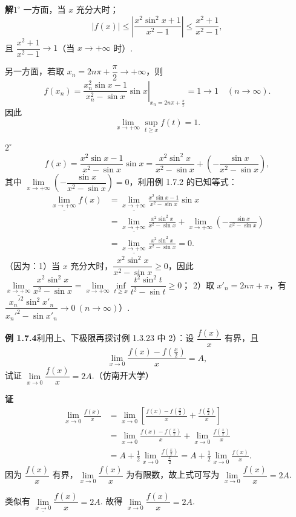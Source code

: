 \documentclass[UTF8,12pt,a4paper,fontset=fandol]{ctexart}
\begin{document}
\noindent\textbf{解}\quad $1^\circ$ 一方面，当 $x$ 充分大时；
\[
  |f(x)|\le \left|\frac{x^2\sin^2 x+1}{x^2-1}\right|\le \frac{x^2+1}{x^2-1},
\]
且 $\dfrac{x^2+1}{x^2-1}\to1$（当 $x\to+\infty$ 时）.

另一方面，若取 $x_n=2n\pi+\dfrac\pi2\to+\infty$，则
\[
  f(x_n)=\left.\frac{x_n^2\sin x-1}{x_n^2-\sin x}\sin x\right|_{x_n=2n\pi+\frac\pi2}
  =1\to1\quad(n\to\infty).
\]
因此
\[
  \lim_{x\to+\infty}\sup_{t\ge x}f(t)=1.
\]

$2^\circ$
\[
  f(x)=\frac{x^2\sin x-1}{x^2-\sin x}\sin x
  =\frac{x^2\sin^2 x}{x^2-\sin x}+\left(-\frac{\sin x}{x^2-\sin x}\right),
\]
其中 $\lim\limits_{x\to+\infty}\left(-\dfrac{\sin x}{x^2-\sin x}\right)=0$，利用例 1.7.2 的已知等式：
\[
\begin{aligned}
  \underline{\lim_{x\to+\infty}}f(x)
  &=\underline{\lim_{x\to+\infty}}\frac{x^2\sin x-1}{x^2-\sin x}\sin x\\
  &=\underline{\lim_{x\to+\infty}}\frac{x^2\sin^2 x}{x^2-\sin x}
    +\lim_{x\to+\infty}\left(-\frac{\sin x}{x^2-\sin x}\right)\\
  &=\underline{\lim_{x\to+\infty}}\frac{x^2\sin^2 x}{x^2-\sin x}=0.
\end{aligned}
\]
（因为：1）当 $x$ 充分大时，$\dfrac{x^2\sin^2 x}{x^2-\sin x}\ge0$，因此
$\underline{\lim\limits_{x\to+\infty}}\dfrac{x^2\sin^2 x}{x^2-\sin x}
=\lim\limits_{x\to+\infty}\inf\limits_{t\ge x}\dfrac{t^2\sin^2 t}{t^2-\sin t}\ge0$；
2）取 $x'_n=2n\pi+\pi$，有 $\dfrac{x_n'^2\sin^2 x'_n}{x_n'^2-\sin x'_n}\to0\ (n\to\infty)$）.

\noindent\textbf{例 1.7.4}\quad 利用上、下极限再探讨例 1.3.23 中 2）：设 $\dfrac{f(x)}x$ 有界，且
\[
  \lim_{x\to0}\frac{f(x)-f\left(\frac{x}{2}\right)}x=A,
\]
试证 $\lim\limits_{x\to0}\dfrac{f(x)}x=2A$.（仿南开大学）

\noindent\textbf{证}\quad
\[
\begin{aligned}
  \lim_{x\to0}\frac{f(x)}x
  &=\lim_{x\to0}\left[\frac{f(x)-f\left(\frac{x}{2}\right)}x+\frac{f\left(\frac{x}{2}\right)}x\right]\\
  &=\lim_{x\to0}\frac{f(x)-f\left(\frac{x}{2}\right)}x+\lim_{x\to0}\frac{f\left(\frac{x}{2}\right)}x\\
  &=A+\frac12\lim_{x\to0}\frac{f\left(\frac{x}{2}\right)}{\frac{x}{2}}
   =A+\frac12\lim_{x\to0}\frac{f(x)}x.
\end{aligned}
\]
因为 $\dfrac{f(x)}x$ 有界，$\lim\limits_{x\to0}\dfrac{f(x)}x$ 为有限数，故上式可写为 $\lim\limits_{x\to0}\dfrac{f(x)}x=2A$.

类似有 $\underline{\lim\limits_{x\to0}}\dfrac{f(x)}x=2A$. 故得 $\lim\limits_{x\to0}\dfrac{f(x)}x=2A$.
\end{document}
